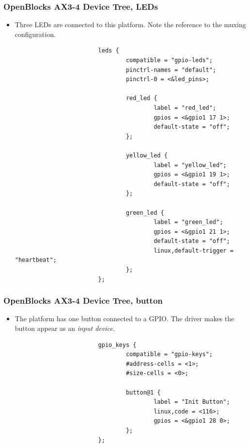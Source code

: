 \begin{frame}[fragile]
  \frametitle{OpenBlocks AX3-4 Device Tree, LEDs}
\begin{itemize}
\item Three LEDs are connected to this platform. Note the reference to
  the  muxing configuration.
  \begin{block}{}
    \begin{verbatim}
                        leds {
                                compatible = "gpio-leds";
                                pinctrl-names = "default";
                                pinctrl-0 = <&led_pins>;

                                red_led {
                                        label = "red_led";
                                        gpios = <&gpio1 17 1>;
                                        default-state = "off";
                                };

                                yellow_led {
                                        label = "yellow_led";
                                        gpios = <&gpio1 19 1>;
                                        default-state = "off";
                                };

                                green_led {
                                        label = "green_led";
                                        gpios = <&gpio1 21 1>;
                                        default-state = "off";
                                        linux,default-trigger = "heartbeat";
                                };
                        };
    \end{verbatim}
    \end{block}
  \end{itemize}
\end{frame}

\begin{frame}[fragile]
  \frametitle{OpenBlocks AX3-4 Device Tree, button}
  \begin{itemize}
  \item The platform has one button connected to a GPIO. The
     driver makes the button appear as an {\em input
      device}.
    \begin{block}{}
      \begin{verbatim}
                        gpio_keys {
                                compatible = "gpio-keys";
                                #address-cells = <1>;
                                #size-cells = <0>;

                                button@1 {
                                        label = "Init Button";
                                        linux,code = <116>;
                                        gpios = <&gpio1 28 0>;
                                };
                        };
    \end{verbatim}
    \end{block}
  \end{itemize}
\end{frame}

